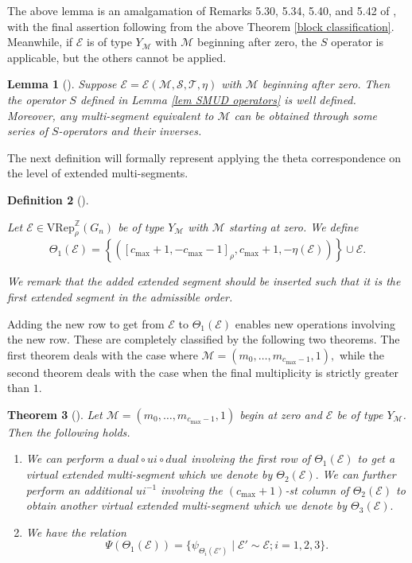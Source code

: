 \documentclass[11pt,letterpaper]{amsart}
\newcommand{\VRep}{{\mathrm{VRep}}}
\newcommand{\EE}{\mathcal{E}}
\newtheorem{thm}{Theorem}[section]
\newtheorem{lemma}[thm]{Lemma}
\newtheorem{defn}[thm]{Definition}
\numberwithin{equation}{section}
\begin{document}
The above lemma is an amalgamation of Remarks 5.30, 5.34, 5.40, and 5.42 of \cite{HKT26}, with the final assertion following from the above Theorem \ref{block classification}. Meanwhile, if $\EE$ is of type $Y_\mathcal{M}$ with $\mathcal{M}$ beginning after zero, the $S$ operator is applicable, but the others cannot be applied.

\begin{lemma}[{\cite[Lemma 5.28]{HKT26}}] \label{S for E starting after 0}
    Suppose $\EE = \mathcal{E}(\mathcal{M}, \mathcal{S}, \mathcal{T},\eta)$ with $\mathcal{M}$ beginning after zero. Then the operator $S$ defined in Lemma \ref{lem SMUD operators} is well defined. Moreover, any multi-segment equivalent to $\mathcal{M}$ can be obtained through some series of $S$-operators and their inverses.
\end{lemma}

The next definition will formally represent applying the theta correspondence on the level of extended multi-segments.

\begin{defn}[{\cite[Definition 6.2]{HKT26}}]\label{defn Theta_1(EE)}
    
    Let $\EE\in\VRep_\rho^\mathbb{Z}(G_n)$ be of type $Y_{\mathcal{M}}$ with $\mathcal{M}$ starting at zero. We define
    \[
    \Theta_1(\EE)=\left\{\left(\left[c_{\max}+1,-c_{\max}-1\right]_{\rho}, {c_{\max}+1}, -\eta(\EE) \right)\right\}\cup \EE.
    \]
    
    We remark that the added extended segment should be inserted such that it is the first extended segment in the admissible order. 
\end{defn}

Adding the new row to get from $\EE$ to $\Theta_1(\EE)$ enables new operations involving the new row. These are completely classified by the following two theorems. The first theorem deals with the case where $\mathcal{M} = (m_0, \dots, m_{c_{\max} - 1}, 1),$ while the second theorem deals with the case when the final multiplicity is strictly greater than $1.$ 

\begin{thm}[{\cite[Theorem 6.4]{HKT26}}]
\label{first block m_n = 1}
    Let $\mathcal{M} = (m_0, \dots, m_{c_{\max} - 1}, 1)$ begin at zero and $\EE$ be of type $Y_\mathcal{M}$. Then the following holds.
    \begin{enumerate}
        \item  We can perform a $dual \circ ui \circ dual$ involving the first row of $\Theta_1(\EE)$ to get a virtual extended multi-segment which we denote by $\Theta_2(\EE).$ We can further perform an additional $ui^{-1}$ involving the $(c_{\max} + 1)$-st column of $\Theta_2(\mathcal{E})$ to obtain another virtual extended multi-segment which we denote by $\Theta_3(\EE).$
        \item We have the relation $$\Psi(\Theta_1(\EE)) = \{\psi_{\Theta_i(\EE')} \mid \mathcal{E}' \sim \mathcal{E}; i = 1, 2, 3 \}.$$
    \end{enumerate}
\end{thm}
\end{document}
